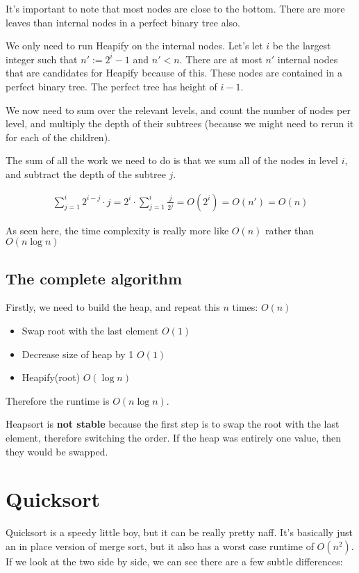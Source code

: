 \documentclass[11pt,a4paper,titlepage,dvipsnames,cmyk]{scrartcl}
\begin{document}
It's important to note that most nodes are close to the bottom. There are
more leaves than internal nodes in a perfect binary tree also.

We only need to run Heapify on the internal nodes. Let's let $i$ be the
largest integer such that $n' := 2^i - 1$ and $n' < n$. There are at most
$n'$ internal nodes that are candidates for Heapify because of this. These
nodes are contained in a perfect binary tree. The perfect tree has height
of $i-1$.

We now need to sum over the relevant levels, and count the number of nodes
per level, and multiply the depth of their subtrees (because we might need
to rerun it for each of the children).

The sum of all the work we need to do is that we sum all of the nodes in
level $i$, and subtract the depth of the subtree $j$.

\begin{align*}
    \sum_{j=1}^{i} 2^{i-j} \cdot j = 2^i \cdot \sum_{j=1}^{i}
    \frac{j}{2^j} = O(2^i) = O(n') = O(n)
\end{align*}

As seen here, the time complexity is really more like $O(n)$ rather than
$O(n \log n)$

\subsection{The complete algorithm}%
\label{sub:The complete algorithm}
Firstly, we need to build the heap, and repeat this $n$ times:  $O(n)$
\begin{itemize}
    \item Swap root with the last element \quad  $O(1)$
    \item Decrease size of heap by 1  \quad  $O(1)$
    \item Heapify(root) \quad $O(\log n)$
\end{itemize}

Therefore the runtime is $O(n \log n)$.

Heapsort is \textbf{not stable} because the first step is to swap the root
with the last element, therefore switching the order. If the heap was
entirely one value, then they would be swapped.

\section{Quicksort}%
\label{sec:Quicksort}
Quicksort is a speedy little boy, but it can be really pretty naff. It's
basically just an in place version of merge sort, but it also has a worst
case runtime of $O(n^2)$. If we look at the two side by side, we can see
there are a few subtle differences:
\end{document}
